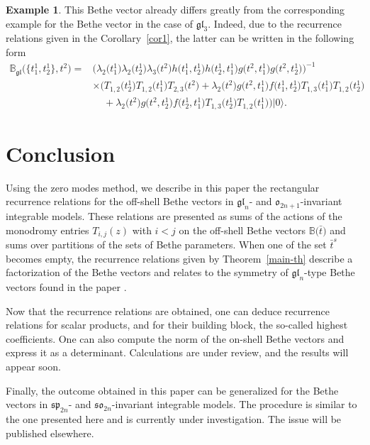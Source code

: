\documentclass[pdftex]{sigma}
\newcommand{\bt}{{\bar t}}
\theoremstyle{definition}
\newtheorem{exam}[thm]{Example}
\def\BB{{\mathbb{B}}}
\def\BBg{\mathbb{B}_{\mathfrak{gl}}}
\begin{document}
\begin{exam}
This Bethe vector already differs greatly from the corresponding example for the
Bethe vector in the case of $\mathfrak{gl}_3$. Indeed, due to the
recurrence relations given in the Corollary~{\rm\ref{cor1}}, the latter can be written
in the following form
\begin{align*}
\BBg\bigl(\bigl\{t^1_1,t^1_2\bigr\},t^2\bigr)={}&\bigl({\lambda_2\bigl(t^1_1\bigr) \lambda_2\bigl(t^1_2\bigr)
\lambda_3\bigl(t^2\bigr)}
{h\bigl(t^1_1,t^1_2\bigr) h\bigl(t^1_2,t^1_1\bigr)} {g\bigl(t^2,t^1_1\bigr) g\bigl(t^2,t^1_2\bigr)}\bigr)^{-1}\\
&\times\bigl(T_{1,2}\bigl(t^1_2\bigr) T_{1,2}\bigl(t^1_1\bigr) T_{2,3}\bigl(t^2\bigr) +\lambda_2\bigl(t^2\bigr) g\bigl(t^2,t^1_1\bigr) f\bigl(t^1_1,t^1_2\bigr) T_{1,3}\bigl(t^1_1\bigr)
T_{1,2}\bigl(t^1_2\bigr)\\
&\phantom{\times}{}+\lambda_2\bigl(t^2\bigr) g\bigl(t^2,t^1_2\bigr) f\bigl(t^1_2,t^1_1\bigr) T_{1,3}\bigl(t^1_2\bigr) T_{1,2}\bigl(t^1_1\bigr)
\bigr) |0\rangle .
\end{align*}
\end{exam}


\section{Conclusion}\label{conclu}

Using the zero modes method, we describe in this paper the rectangular recurrence
relations for the off-shell Bethe vectors in $\mathfrak{gl}_n$- and
$\mathfrak{o}_{2n+1}$-invariant integrable models. These relations
are presented as sums of the actions of the monodromy entries
$T_{i,j}(z)$ with $i<j$ on the off-shell Bethe vectors $\BB\bigl(\bt\bigr)$ and sums
over partitions of the sets of Bethe parameters. When one of the
set $\bt^s$ becomes empty, the recurrence relations given by
Theorem~\ref{main-th} describe a factorization of the Bethe vectors
and relates to the symmetry of $\mathfrak{gl}_n$-type Bethe vectors found in the
paper \cite{LPRS-New}.

Now that the recurrence relations are obtained, one can deduce recurrence relations for scalar products, and for their building block, the so-called highest coefficients. One can also compute the norm of the on-shell Bethe vectors and express it as a determinant. Calculations are under review, and the results will appear soon.

Finally, the outcome obtained in this paper can be generalized for the Bethe vectors
in $\mathfrak{sp}_{2n}$- and $\mathfrak{so}_{2n}$-invariant integrable models. The procedure is similar to the one presented here and is
currently under investigation.
The issue will be published elsewhere.
\end{document}
